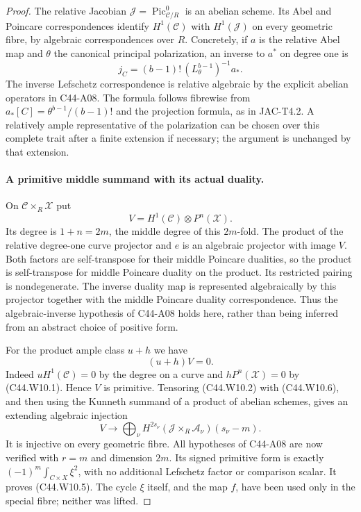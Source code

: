 \documentclass[11pt]{article}
\theoremstyle{remark}\newtheorem{remark}[theorem]{Remark}
\begin{document}
\begin{proof}
The relative Jacobian $\mathscr J=\operatorname{Pic}^0_{\mathscr C/R}$
is an abelian scheme. Its Abel and Poincare correspondences identify
$H^1(\mathscr C)$ with $H^1(\mathscr J)$ on every geometric fibre,
by algebraic correspondences over $R$. Concretely, if $a$ is the
relative Abel map and $\theta$ the canonical principal polarization,
an inverse to $a^*$ on degree one is
\[
        j_C=(b-1)!\,(L_\theta^{b-1})^{-1}a_*.
 \tag{C44.W10.6}
\]
The inverse Lefschetz correspondence is relative algebraic by the
explicit abelian operators in C44-A08. The formula follows fibrewise
from $a_*[C]=\theta^{b-1}/(b-1)!$ and the projection formula, as in
JAC-T4.2. A relatively ample representative of the polarization can
be chosen over this complete trait after a finite extension if
necessary; the argument is unchanged by that extension.

\paragraph{A primitive middle summand with its actual duality.}
On $\mathscr C\times_R\mathscr X$ put
\[
                  V=H^1(\mathscr C)\otimes P^n(\mathscr X).
\]
Its degree is $1+n=2m$, the middle degree of this $2m$-fold.
The product of the relative degree-one curve projector and $e$
is an algebraic projector with image $V$. Both factors are
self-transpose for their middle Poincare dualities, so the product
is self-transpose for middle Poincare duality on the product.
Its restricted pairing is nondegenerate. The inverse duality map
is represented algebraically by this projector together with the
middle Poincare duality correspondence. Thus the algebraic-inverse
hypothesis of C44-A08 holds here, rather than being inferred from
an abstract choice of positive form.

For the product ample class $u+h$ we have
\[
                       (u+h)V=0.
 \tag{C44.W10.7}
\]
Indeed $uH^1(\mathscr C)=0$ by the degree on a curve and
$hP^n(\mathscr X)=0$ by (C44.W10.1). Hence $V$ is primitive.
Tensoring (C44.W10.2) with (C44.W10.6), and then using the Kunneth
summand of a product of abelian schemes, gives an extending
algebraic injection
\[
 V\longrightarrow
 \bigoplus_\nu H^{2s_\nu}(\mathscr J\times_R\mathscr A_\nu)
                                  (s_\nu-m).
 \tag{C44.W10.8}
\]
It is injective on every geometric fibre. All hypotheses of
C44-A08 are now verified with $r=m$ and dimension $2m$.
Its signed primitive form is exactly
$(-1)^m\int_{C\times X}\xi^2$, with no additional Lefschetz
factor or comparison scalar. It proves (C44.W10.5).
The cycle $\xi$ itself, and the map $f$, have been used only in the
special fibre; neither was lifted.


\end{proof}
\end{document}
